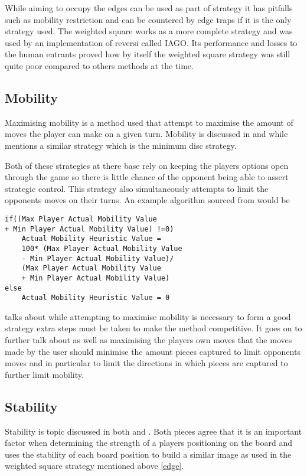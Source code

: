 \documentclass[review]{cmpreport}
\begin{document}
While aiming to occupy the edges can be used  as part of strategy it has pitfalls such as mobility restriction and can be countered by edge traps if it is the only strategy used. The weighted square works as a more complete strategy and was used by an implementation of reversi called IAGO. Its performance and losses to the human entrants proved how by itself the weighted square strategy was still quite poor compared to others methods at the time.

\subsection{Mobility}
Maximising mobility is a method used that attempt to maximise the amount of moves the player can make on a given turn. Mobility is discussed in \citet{lee1986bill} and \citet{sannidhanam2015analysis} while \citet{rosenbloom1982world} mentions a similar strategy which is the minimum disc strategy.

Both of these strategies at there base rely on keeping the players options open through the game so there is little chance of the opponent being able to assert strategic control. This strategy also simultaneously attempts to limit the opponents moves on their turns. An example algorithm sourced from \citet{sannidhanam2015analysis} would be
\begin{lstlisting}
if((Max Player Actual Mobility Value 
+ Min Player Actual Mobility Value) !=0)
	Actual Mobility Heuristic Value =
	100* (Max Player Actual Mobility Value 
	- Min Player Actual Mobility Value)/
	(Max Player Actual Mobility Value 
	+ Min Player Actual Mobility Value)
else
	Actual Mobility Heuristic Value = 0 
\end{lstlisting}

\citet{lee1986bill} talks about while attempting to maximise mobility is necessary to form a good strategy extra steps must be taken to make the method competitive. It goes on to further talk about as well as maximising the players own moves that the moves made by the user should minimise the amount pieces captured to limit opponents moves and in particular to limit the directions in which pieces are captured to further limit mobility.

\subsection{Stability}
Stability is topic discussed in both \citet{rosenbloom1982world} and \citet{sannidhanam2015analysis}. Both pieces agree that it is an important factor when determining the strength of a players positioning on the board and \citet{sannidhanam2015analysis} uses the stability of each board position to build a similar image as used in the weighted square strategy mentioned above \ref{edge}.
\end{document}
